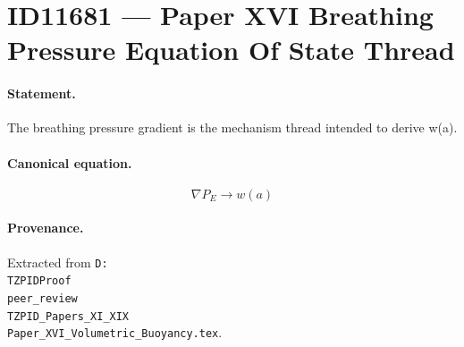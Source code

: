 \section*{ID11681 --- Paper XVI Breathing Pressure Equation Of State Thread}

\paragraph{Statement.}
The breathing pressure gradient is the mechanism thread intended to derive w(a).

\paragraph{Canonical equation.}
\[
\nabla P_E\to w(a)
\]

\paragraph{Provenance.}
Extracted from \texttt{D:\\TZPIDProof\\peer\_review\\TZPID\_Papers\_XI\_XIX\\Paper\_XVI\_Volumetric\_Buoyancy.tex}.
